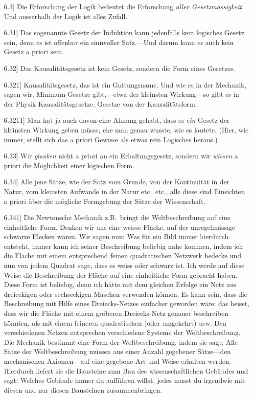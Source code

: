 \documentclass[12pt,oneside]{book}[2007/10/19]
\newcommand{\PropERef}[1]{\hyperref[PropE:#1]{#1}}
\newcommand{\PropositionG}[2]{%
  \item[\phantomsection\label{PropG:#1}\PropERef{#1}] #2%
}
\newcommand{\Emph}[1]{\emph{#1}}%
\newcommand{\zumBeispiel}{z.\;B.}
\begin{document}
\begin{propositions}
\PropositionG{6.3}
{Die Erforschung der Logik bedeutet die Erforschung
\Emph{aller Gesetzmässigkeit}. Und ausserhalb
der Logik ist alles Zufall.}


\PropositionG{6.31}
{Das sogenannte Gesetz der Induktion kann
jedenfalls kein logisches Gesetz sein, denn es ist
offenbar ein sinnvoller Satz.---Und darum kann es
auch kein Gesetz a priori sein.}


\PropositionG{6.32}
{Das Kausalitätsgesetz ist kein Gesetz, sondern
die Form eines Gesetzes.}


\PropositionG{6.321}
{\glqq{}Kausalitätsgesetz\grqq{}, das ist ein Gattungsname.
Und wie es in der Mechanik, sagen wir, Minimum-Gesetze
gibt,---etwa der kleinsten Wir\-kung---so
gibt es in der Physik Kausalitätsgesetze, Gesetze
von der Kausalitätsform.}


\PropositionG{6.3211}
{Man hat ja auch davon eine Ahnung gehabt, dass
es \Emph{ein} \glqq{}Gesetz der kleinsten Wirkung\grqq{} geben müsse,
ehe man genau wuss\-te, wie es lautete. (Hier, wie
immer, stellt sich das a priori Gewisse als etwas
rein Logisches heraus.)}


\PropositionG{6.33}
{Wir \Emph{glauben} nicht a priori an ein Erhaltungsgesetz,
sondern wir \Emph{wissen} a priori die
Möglichkeit einer logischen Form.}


\PropositionG{6.34}
{Alle jene Sätze, wie der Satz vom Grunde, von
der Kontinuität in der Natur, vom kleinsten Aufwande
in der Natur etc.\ etc., alle diese sind Einsichten
a priori über die mögliche Formgebung der
Sätze der Wissenschaft.}


\PropositionG{6.341}
{Die Newtonsche Mechanik \zumBeispiel\ bringt die Weltbeschreibung
auf eine einheitliche Form. Denken
wir uns eine weisse Fläche, auf der unregelmässige
schwarze Flecken wären. Wir sagen nun: Was für
ein Bild immer hierdurch entsteht, immer kann ich
seiner Beschreibung beliebig nahe kommen, indem
ich die Fläche mit einem entsprechend feinen quadratischen
Netzwerk bedecke und nun von jedem
Quadrat sage, dass es weiss oder schwarz ist. Ich
werde auf diese Weise die Beschreibung der Fläche
auf eine einheitliche Form gebracht haben. Diese
Form ist beliebig, denn ich hätte mit dem gleichen
Erfolge ein Netz aus dreieckigen oder sechseckigen
Maschen verwenden können. Es kann sein, dass
die Beschreibung mit Hilfe eines Dreiecks-Netzes
einfacher geworden wäre; das heisst, dass wir die
Fläche mit einem gröberen Dreiecks-Netz genauer
beschreiben könnten, als mit einem feineren quadratischen
(oder umgekehrt) usw. Den verschiedenen
Netzen entsprechen verschiedene Systeme der
Weltbeschreibung. Die Mechanik bestimmt eine
Form der Weltbeschreibung, indem sie sagt:
Alle Sätze der Weltbeschreibung müssen aus einer
Anzahl gegebener Sätze---den mechanischen Axiomen---auf
eine gegebene Art und Weise erhalten
werden. Hierdurch liefert sie die Bausteine zum
Bau des wissenschaftlichen Gebäudes und sagt:
Welches Gebäude immer du aufführen willst, jedes
musst du irgendwie mit diesen und nur diesen
Bausteinen zusammenbringen.

}
\end{propositions}
\end{document}
